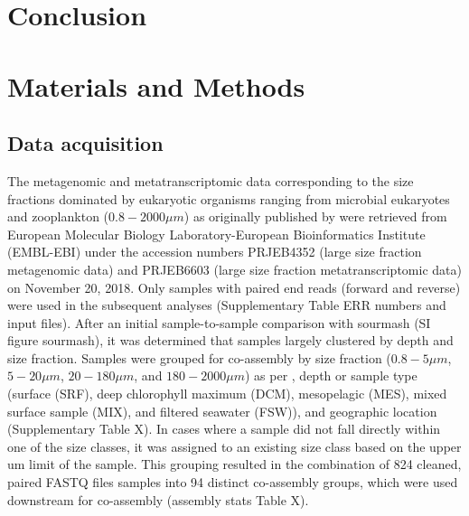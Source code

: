 \documentclass[12pt]{article}
\numberwithin{equation}{section}
\begin{document}
\section*{Conclusion}





\section*{Materials and Methods}

\subsection*{Data acquisition} The metagenomic and metatranscriptomic data corresponding to the size fractions dominated by eukaryotic organisms ranging from ﻿microbial eukaryotes and zooplankton ($0.8 -  2000 \mu m$) as originally published by \citet{Carradec2018global} were retrieved from ﻿European Molecular Biology Laboratory-European Bioinformatics Institute (EMBL-EBI) under the accession numbers PRJEB4352 (large size fraction metagenomic data) and PRJEB6603 (large size fraction metatranscriptomic data) on November 20, 2018. Only samples with paired end reads (forward and reverse) were used in the subsequent analyses (Supplementary Table ERR numbers and input files). After an initial sample-to-sample comparison with sourmash (SI figure sourmash), it was determined that samples largely clustered by depth and size fraction. Samples were grouped for co-assembly by size fraction ($0.8 - 5 \mu m$, $5-20 \mu m$, $20-180 \mu m$, and $180-2000 \mu m$) as per \citet{Carradec2018global}, depth or sample type (surface (SRF), deep chlorophyll maximum (DCM), mesopelagic (MES), mixed surface sample (MIX), and filtered seawater (FSW)), and geographic location (Supplementary Table X). In cases where a sample did not fall directly within one of the size classes, it was assigned to an existing size class based on the upper um limit of the sample. This grouping resulted in the combination of 824 cleaned, paired FASTQ files samples into 94 distinct co-assembly groups, which were used downstream for co-assembly (assembly stats Table X). 
\end{document}
